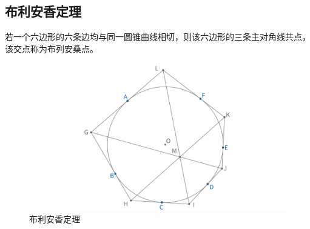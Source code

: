 \newpage
\subsection{布利安香定理}
\begin{theorem}
若一个六边形的六条边均与同一圆锥曲线相切，则该六边形的三条主对角线共点，该交点称为布列安桑点。\end{theorem}
\begin{figure}[htbp]
    \centering
    \includegraphics[width=\linewidth]{figures/布利安香.png}
    \caption{布利安香定理}
\end{figure}


